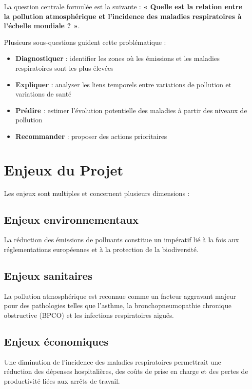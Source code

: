 \documentclass[11pt,a4paper]{article}
\begin{document}
La question centrale formulée est la suivante : \textbf{« Quelle est la relation entre la pollution atmosphérique et l'incidence des maladies respiratoires à l'échelle mondiale ? »}.

Plusieurs sous-questions guident cette problématique :
\begin{itemize}[noitemsep]
    \item \textbf{Diagnostiquer} : identifier les zones où les émissions et les maladies respiratoires sont les plus élevées
    \item \textbf{Expliquer} : analyser les liens temporels entre variations de pollution et variations de santé
    \item \textbf{Prédire} : estimer l'évolution potentielle des maladies à partir des niveaux de pollution
    \item \textbf{Recommander} : proposer des actions prioritaires
\end{itemize}

\clearpage
\section{Enjeux du Projet}

Les enjeux sont multiples et concernent plusieurs dimensions :

\subsection{Enjeux environnementaux}
La réduction des émissions de polluants constitue un impératif lié à la fois aux réglementations européennes et à la protection de la biodiversité.

\subsection{Enjeux sanitaires}
La pollution atmosphérique est reconnue comme un facteur aggravant majeur pour des pathologies telles que l'asthme, la bronchopneumopathie chronique obstructive (BPCO) et les infections respiratoires aiguës.

\subsection{Enjeux économiques}
Une diminution de l'incidence des maladies respiratoires permettrait une réduction des dépenses hospitalières, des coûts de prise en charge et des pertes de productivité liées aux arrêts de travail.
\end{document}

